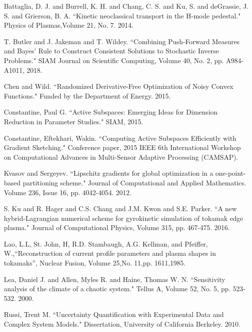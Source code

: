 \documentclass{amsart}
\begin{document}
\begin{thebibliography}{65}

 Battaglia, D. J.  and Burrell, K. H.  and Chang, C. S.  and Ku, S.  and deGrassie, J. S.  and Grierson, B. A. ``Kinetic neoclassical transport in the H-mode pedestal." Physics of Plasmas,Volume 21, No. 7. 2014.


 T. Butler and J. Jakeman and T. Wildey.
``Combining Push-Forward Measures and Bayes' Rule to Construct Consistent Solutions to Stochastic Inverse Problems." SIAM Journal on Scientific Computing, Volume 40, No. 2, pp. A984-A1011, 2018.



 Chen and Wild. ``Randomized Derivative-Free Optimization of Noisy Convex Functions." Funded by the Department of Energy. 2015.

 Constantine, Paul G. ``Active Subspaces: Emerging Ideas for Dimension Reduction in Parameter Studies." SIAM, 2015.

 Constantine, Eftekhari, Wakin. ``Computing Active Subspaces Efficiently with Gradient Sketching." Conference paper, 2015 IEEE 6th International Workshop on Computational Advances in Multi-Sensor Adaptive Processing (CAMSAP).


 Kvasov and Sergeyev. ``Lipschitz gradients for global optimization in a one-point-based partitioning scheme." Journal of Computational and Applied Mathematics. Volume 236, Issue 16, pp. 4042-4054. 2012.

 S. Ku and R. Hager and C.S. Chang and J.M. Kwon and S.E. Parker. ``A new hybrid-Lagrangian numerical scheme for gyrokinetic simulation of tokamak edge plasma." Journal of Computational Physics, Volume 315, pp. 467-475. 2016.

 Lao, L.L, St. John, H, R.D. Stambaugh, A.G. Kellman, and Pfeiffer, W.,``Reconstruction of current profile parameters and plasma shapes in tokamaks'', Nuclear Fusion, Volume 25,No. 11,pp. 1611,1985.

 Lea, Daniel J. and Allen, Myles R. and Haine, Thomas W. N. ``Sensitivity analysis of the climate of a chaotic system." Tellus A, Volume 52, No. 5, pp. 523-532. 2000.






 Russi, Trent M. ``Uncertainty Quantification with Experimental Data and Complex System Models." Dissertation, University of California Berkeley. 2010.


\end{thebibliography}
\end{document}
